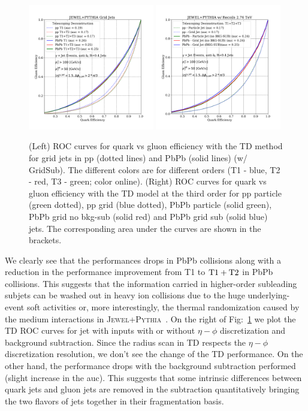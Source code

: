 \documentclass[notoc]{JHEP3}
\newcommand{\jwpy}{\textsc{Jewel+Pythia}~}
\begin{document}
\begin{figure}[t]
	\centering
        \includegraphics[width=0.49\textwidth]{plots/JEWELPYTHIA_TD_2p76TeV_ppvsPbPb.pdf}
        \includegraphics[width=0.49\textwidth]{plots/JEWELPYTHIA_TD123_2p76TeV_ppvsPbPb_comp_QvsG.pdf}
	\caption{(Left) ROC curves for quark vs gluon efficiency with the TD method for grid jets in pp (dotted lines) and PbPb (solid lines) (w/ GridSub). The different colors are for different orders (T1 - blue, T2 - red, T3 - green; color online). (Right) ROC curves for quark vs gluon efficiency with the TD model at the third order for pp particle (green dotted), pp grid (blue dotted), PbPb particle (solid green), PbPb grid no bkg-sub (solid red) and PbPb grid sub (solid blue) jets. The corresponding area under the curves are shown in the brackets.}
	\label{fig:ROC_TD_grid}
\end{figure}

We clearly see that the performances drops in PbPb collisions along with a reduction in the performance improvement from T1 to $\rm T1+T2$ in PbPb collisions. This suggests that the information carried in higher-order subleading subjets can be washed out in heavy ion collisions due to the huge underlying-event soft activities or, more interestingly, the thermal randomization caused by the medium interactions in \jwpy. On the right of Fig:~\ref{fig:ROC_TD_grid} we plot the TD ROC curves for jet with inputs with or without $\eta-\phi$ discretization and background subtraction. Since the radius scan in TD respects the $\eta-\phi$ discretization resolution, we don't see the change of the TD performance. On the other hand, the performance drops with the background subtraction performed (slight increase in the auc). This suggests that some intrinsic differences between quark jets and gluon jets are removed in the subtraction quantitatively bringing the two flavors of jets together in their fragmentation basis.
\end{document}
